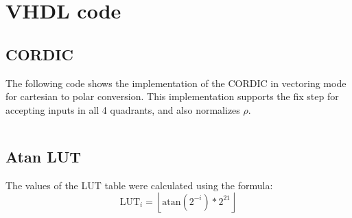 \chapter{VHDL code}


\section{CORDIC}
The following code shows the implementation of the CORDIC in vectoring mode for cartesian to polar conversion. This implementation supports the fix step for accepting inputs in all 4 quadrants, and also normalizes \( \rho \).
\begin{code}
    \inputminted{vhdl}{../vhdl/src/CORDIC.vhd}
    \label{code:vhdl}
\end{code}


\section{Atan LUT}
The values of the LUT table were calculated using the formula:
\[
    \text{LUT}_i = \left\lfloor \text{atan}(2^{-i} )* 2^{21} \right\rfloor
\]
\begin{code}
    \inputminted{vhdl}{../vhdl/src/ATAN_LUT.vhd}
    \label{code:lut}
\end{code}
